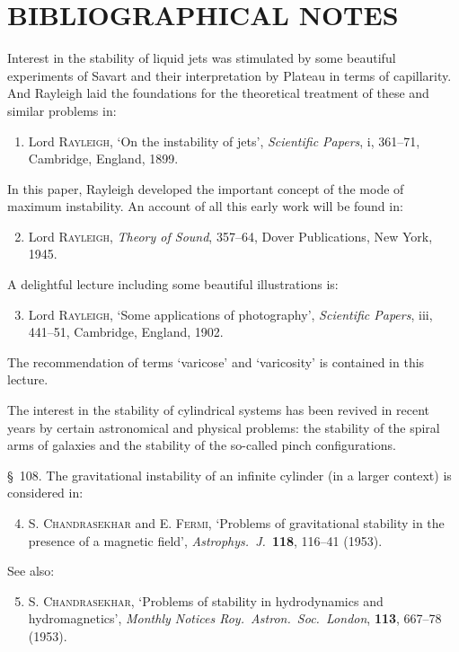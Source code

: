 \section*{BIBLIOGRAPHICAL NOTES}\label{sec:12-bib}

Interest in the stability of liquid jets was stimulated by some beautiful experiments of Savart and their interpretation by Plateau in terms of capillarity. And Rayleigh laid the foundations for the theoretical treatment of these and similar problems in:

\begin{enumerate}
\item Lord \textsc{Rayleigh}, `On the instability of jets', \emph{Scientific Papers}, i, 361--71, Cambridge, England, 1899.
\end{enumerate}
In this paper, Rayleigh developed the important concept of the mode of maximum instability. An account of all this early work will be found in:
\begin{enumerate}
\setcounter{enumi}{1}
\item Lord \textsc{Rayleigh}, \emph{Theory of Sound}, 357--64, Dover Publications, New York, 1945.
\end{enumerate}
A delightful lecture including some beautiful illustrations is:
\begin{enumerate}
\setcounter{enumi}{2}
\item Lord \textsc{Rayleigh}, `Some applications of photography', \emph{Scientific Papers}, iii, 441--51, Cambridge, England, 1902.
\end{enumerate}
The recommendation of terms `varicose' and `varicosity' is contained in this lecture.

The interest in the stability of cylindrical systems has been revived in recent years by certain astronomical and physical problems: the stability of the spiral arms of galaxies and the stability of the so-called pinch configurations.

\S~108. The gravitational instability of an infinite cylinder (in a larger context) is considered in:
\begin{enumerate}
\setcounter{enumi}{3}
\item S. \textsc{Chandrasekhar} and E. \textsc{Fermi}, `Problems of gravitational stability in the presence of a magnetic field', \emph{Astrophys.\ J.}\ \textbf{118}, 116--41 (1953).
\end{enumerate}
See also:
\begin{enumerate}
\setcounter{enumi}{4}
\item S. \textsc{Chandrasekhar}, `Problems of stability in hydrodynamics and hydromagnetics', \emph{Monthly Notices Roy.\ Astron.\ Soc.\ London}, \textbf{113}, 667--78 (1953).
\end{enumerate}

